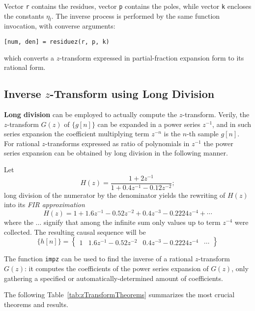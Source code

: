 \documentclass[\documentfontsize, twocolumn]{\classname}
\begin{document}
Vector \texttt{r} contains the residues, vector \texttt{p} contains the poles, while vector \texttt{k} encloses the constants $\eta_l$. The inverse process is performed by the same function invocation, with converse arguments:
\begin{verbatim}
[num, den] = residuez(r, p, k)
\end{verbatim}
which converts a $z$-transform expressed in partial-fraction expansion form to its rational form.

\subsection{Inverse $z$-Transform using Long Division}

\textbf{Long division} can be employed to actually compute the $z$-transform. Verily, the $z$-transform $G(z)$ of $\{g[n]\}$ can be expanded in a power series $z^{-1}$, and in such series expansion the coefficient multiplying term $z^{-n}$ is the $n$-th sample $g[n]$. For rational $z$-transforms expressed as ratio of polynomials in $z^{-1}$ the power series expansion can be obtained by long division in the following manner.

Let
\[
    H(z) = \frac {
        1 + 2z^{-1}
    } {
        1 + 0.4z^{-1} - 0.12z^{-2}
    };
\]
long division of the numerator by the denominator yields the rewriting of $H(z)$ into its \emph{FIR approximation}
\[
    H(z) = 1 + 1.6z^{-1} - 0.52z^{-2} + 0.4z^{-3} - 0.2224z^{-4} + \cdots
\]
where the $\dots$ signify that among the infinite sum only values up to term $z^{-4}$ were collected. The resulting causal sequence will be
\[
    \{h[n]\} =
    \begin{Bmatrix} 
        1 & 1.6z^{-1} - 0.52z^{-2} & 0.4z^{-3} - 0.2224z^{-4} & \cdots
    \end{Bmatrix}
\]

The function \texttt{impz} can be used to find the inverse of a rational $z$-transform $G(z)$: it computes the coefficients of the power series expansion of $G(z)$, only gathering a specified or automatically-determined amount of coefficients.

The following Table~\ref{tab:zTransformTheorems} summarizes the most crucial theorems and results.
\end{document}
